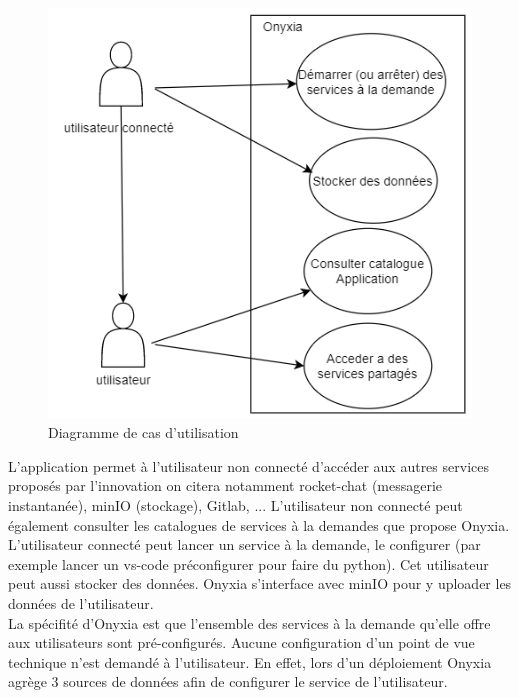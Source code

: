 \documentclass[11pt,fleqn]{book} %
\begin{document}
\begin{figure}
    \vspace{-1cm}
    \renewcommand{\figurename}{Diagramme}
    \includegraphics[scale=0.7]{Pictures/onyxia/onyxia-cu.PNG}
    \caption[]{Diagramme de cas d'utilisation \newline}
\end{figure}

L'application permet à l'utilisateur non connecté d'accéder aux autres services proposés par l'innovation on citera notamment rocket-chat (messagerie instantanée), minIO (stockage), Gitlab, ... L'utilisateur non connecté peut également consulter les catalogues de services à la demandes que propose Onyxia. L'utilisateur connecté peut lancer un service à la demande, le configurer (par exemple lancer un vs-code préconfigurer pour faire du python). Cet utilisateur peut aussi stocker des données. Onyxia s'interface avec minIO pour y uploader les données de l'utilisateur.\\

La spécifité d'Onyxia est que l'ensemble des services à la demande qu'elle offre aux utilisateurs sont pré-configurés. Aucune configuration d'un point de vue technique n'est demandé à l'utilisateur. En effet, lors d'un déploiement Onyxia agrège 3 sources de données afin de configurer le service de l'utilisateur. \\
\end{document}
